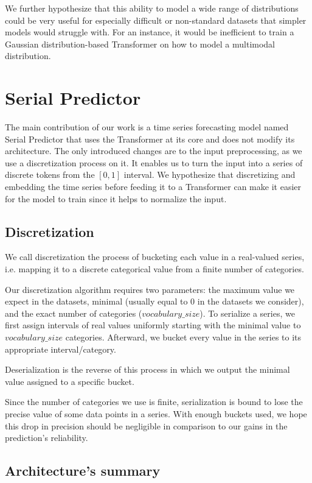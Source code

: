 \documentclass[en]{pracamgr}
\begin{document}
	We further hypothesize that this ability to model a wide range of distributions could be very useful for especially difficult or non-standard datasets that simpler models would struggle with. For an instance, it would be inefficient to train a Gaussian distribution-based Transformer on how to model a multimodal distribution.
	
	\section{Serial Predictor}
	The main contribution of our work is a time series forecasting model named Serial Predictor that uses the Transformer at its core and does not modify its architecture. The only introduced changes are to the input preprocessing, as we use a discretization process on it. It enables us to turn the input into a series of discrete tokens from the $[0, 1]$ interval. We hypothesize that discretizing and embedding the time series before feeding it to a Transformer can make it easier for the model to train since it helps to normalize the input.
	
	
	\subsection{Discretization}\label{s:disc}
	
	
	We call discretization the process of bucketing each value in a real-valued series, i.e. mapping it to a discrete categorical value from a finite number of categories.
	
	Our discretization algorithm requires two parameters: the maximum value we expect in the datasets, minimal (usually equal to 0 in the datasets we consider), and the exact number of categories ($vocabulary\_size$).
	To serialize a series, we first assign intervals of real values uniformly starting with the minimal value to $vocabulary\_size$ categories.
	Afterward, we bucket every value in the series to its appropriate interval/category.
	
	
	Deserialization is the reverse of this process in which we output the minimal value assigned to a specific bucket. 
	
	Since the number of categories we use is finite, serialization is bound to lose the precise value of some data points in a series. With enough buckets used, we hope this drop in precision should be negligible in comparison to our gains in the prediction's reliability. 
	
	\subsection{Architecture's summary}
	
\end{document}

